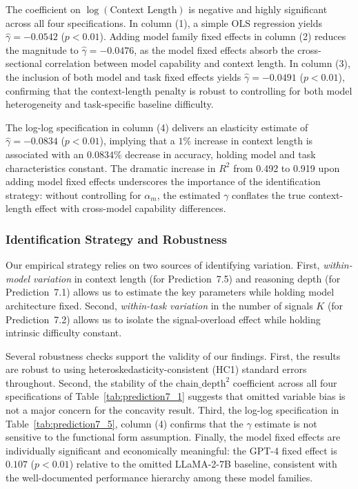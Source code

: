 The coefficient on $\log(\text{Context Length})$ is negative and highly significant across all four specifications. In column (1), a simple OLS regression yields $\hat{\gamma} = -0.0542$ ($p{<}0.01$). Adding model family fixed effects in column (2) reduces the magnitude to $\hat{\gamma} = -0.0476$, as the model fixed effects absorb the cross-sectional correlation between model capability and context length. In column (3), the inclusion of both model and task fixed effects yields $\hat{\gamma} = -0.0491$ ($p{<}0.01$), confirming that the context-length penalty is robust to controlling for both model heterogeneity and task-specific baseline difficulty.

The log-log specification in column (4) delivers an elasticity estimate of $\hat{\gamma} = -0.0834$ ($p{<}0.01$), implying that a $1\%$ increase in context length is associated with an $0.0834\%$ decrease in accuracy, holding model and task characteristics constant. The dramatic increase in $R^2$ from 0.492 to 0.919 upon adding model fixed effects underscores the importance of the identification strategy: without controlling for $\alpha_m$, the estimated $\gamma$ conflates the true context-length effect with cross-model capability differences.

\subsubsection{Identification Strategy and Robustness}

Our empirical strategy relies on two sources of identifying variation. First, \emph{within-model variation} in context length (for Prediction~7.5) and reasoning depth (for Prediction~7.1) allows us to estimate the key parameters while holding model architecture fixed. Second, \emph{within-task variation} in the number of signals $K$ (for Prediction~7.2) allows us to isolate the signal-overload effect while holding intrinsic difficulty constant.

Several robustness checks support the validity of our findings. First, the results are robust to using heteroskedasticity-consistent (HC1) standard errors throughout. Second, the stability of the $\text{chain\_depth}^2$ coefficient across all four specifications of Table~\ref{tab:prediction7_1} suggests that omitted variable bias is not a major concern for the concavity result. Third, the log-log specification in Table~\ref{tab:prediction7_5}, column (4) confirms that the $\gamma$ estimate is not sensitive to the functional form assumption. Finally, the model fixed effects are individually significant and economically meaningful: the GPT-4 fixed effect is $0.107$ ($p{<}0.01$) relative to the omitted LLaMA-2-7B baseline, consistent with the well-documented performance hierarchy among these model families.

